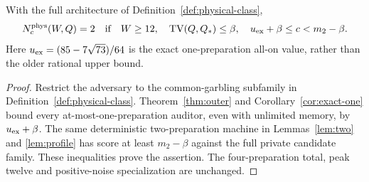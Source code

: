 \begin{corollary}
\label{cor:improved-physical}
With the full architecture of Definition~\ref{def:physical-class},
\[
 N_c^{\rm phys}(W,Q)=2
 \quad\text{if}\quad W\ge12,\quad \operatorname{TV}(Q,Q_*)\le\beta,
 \quad u_{\rm ex}+\beta\le c<m_2-\beta.
\]
Here $u_{\rm ex}=(85-7\sqrt{73})/64$ is the exact one-preparation
all-on value, rather than the older rational upper bound.
\end{corollary}
\begin{proof}
Restrict the adversary to the common-garbling subfamily in
Definition~\ref{def:physical-class}. Theorem~\ref{thm:outer} and
Corollary~\ref{cor:exact-one} bound every at-most-one-preparation auditor,
even with unlimited memory, by $u_{\rm ex}+\beta$. The same deterministic
two-preparation machine in Lemmas~\ref{lem:two} and \ref{lem:profile}
has score at least $m_2-\beta$ against the full private candidate family.
These inequalities prove the assertion. The four-preparation total,
peak twelve and positive-noise specialization are unchanged.
\end{proof}
